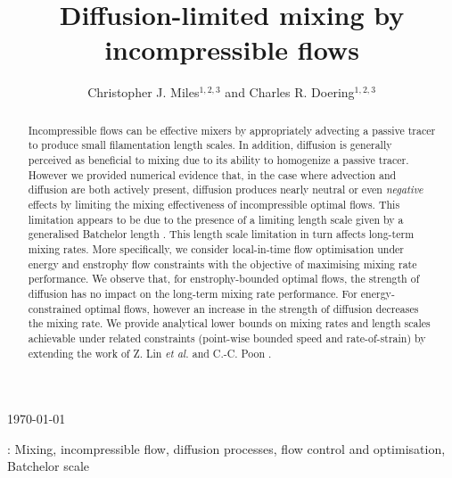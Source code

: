 \documentclass[12pt]{iopart}
\begin{document}
\title[Diffusion-limited mixing by incompressible flows]{Diffusion-limited mixing by incompressible flows}

\author{Christopher J. Miles$^{1,2,3}$ and Charles R. Doering$^{1,2,3}$ }

\address{$^1$ Department of Physics, University of Michigan,
Ann Arbor, MI 48104-1040, USA}
\address{$^2$ Department of Mathematics, University of Michigan,
Ann Arbor, MI 48104-1043, USA}
\address{$^3$ Center for the Study of Complex Systems, University of Michigan,
Ann Arbor, MI 48104-1107, USA}
\vspace{10pt}
\begin{indented}
\item[]\today
\end{indented}

\begin{abstract}
Incompressible flows can be effective mixers by appropriately advecting a passive tracer to produce small filamentation length scales. In addition, diffusion is generally perceived as beneficial to mixing due to its ability to homogenize a passive tracer. However we provided numerical evidence that, in the case where advection and diffusion are both actively present, diffusion produces nearly neutral or even {\it negative} effects by limiting the mixing effectiveness of incompressible optimal flows. This limitation appears to be due to the presence of a limiting length scale given by a generalised Batchelor length \cite{Batchelor1959a}. This length scale limitation in turn affects long-term mixing rates. More specifically, we consider local-in-time flow optimisation under energy and enstrophy flow constraints with the objective of maximising mixing rate performance. We observe that, for enstrophy-bounded optimal flows, the strength of diffusion has no impact on the long-term mixing rate performance. For energy-constrained optimal flows, however an increase in the strength of diffusion decreases the mixing rate. We provide analytical lower bounds on mixing rates and length scales achievable under related constraints (point-wise bounded speed and rate-of-strain) by extending the work of Z. Lin {\it et al.} \cite{JFM2011} and C.-C. Poon \cite{Chi-Cheu1996}. 
\end{abstract}
%
%
\vspace{2pc}
: Mixing, incompressible flow, diffusion processes, flow control and optimisation, Batchelor scale
\end{document}
